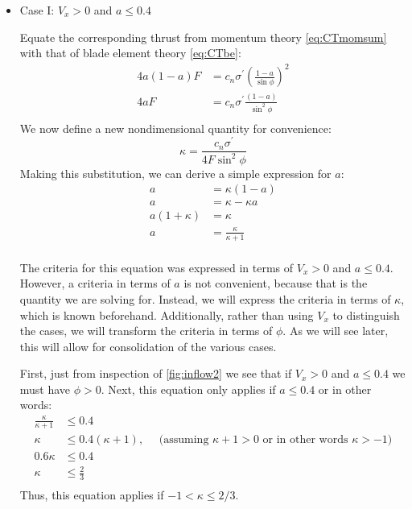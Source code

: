 \begin{itemize}

\item Case I: $V_x > 0$ and $a \le 0.4$

Equate the corresponding thrust from momentum theory \cref{eq:CTmomsum} with that of blade element theory \cref{eq:CTbe}:
\begin{equation}
    \begin{aligned}
        4 a (1 - a) F &= c_n \sigma^\prime \left(\frac{1-a}{\sin\phi}\right)^2\\
        4 a F &= c_n \sigma^\prime \frac{(1-a)}{\sin^2\phi}\\
    \end{aligned}
\end{equation}
We now define a new nondimensional quantity for convenience:
\begin{equation}
    \kappa = \frac{c_n \sigma^\prime}{4 F \sin^2 \phi}
\end{equation}
Making this substitution, we can derive a simple expression for $a$:
\begin{equation}
    \begin{aligned}
        a &= \kappa (1-a)\\
        a &= \kappa - \kappa a\\
        a (1 + \kappa) &= \kappa\\
        a &= \frac{\kappa}{\kappa + 1}\\
    \end{aligned}
\end{equation}

The criteria for this equation was expressed in terms of $V_x > 0$ and $a \le 0.4$.  However, a criteria in terms of $a$ is not convenient, because that is the quantity we are solving for.  Instead, we will express the criteria in terms of $\kappa$, which is known beforehand.  Additionally, rather than using $V_x$ to distinguish the cases, we will transform the criteria in terms of $\phi$.  As we will see later, this will allow for consolidation of the various cases.

First, just from inspection of \cref{fig:inflow2} we see that if $V_x > 0$ and $a \le 0.4$ we must have $\phi > 0$.  Next, this equation only applies if $a \le 0.4$ or in other words:
\begin{equation}
    \begin{aligned}
        \frac{\kappa}{\kappa + 1} &\le 0.4\\
        \kappa &\le 0.4 (\kappa + 1) ,\quad \text{ (assuming $\kappa + 1 > 0$ or in other words $\kappa > -1$)}\\
        0.6 \kappa &\le 0.4 \\
        \kappa &\le \frac{2}{3} \\
    \end{aligned}
\end{equation}
Thus, this equation applies if $-1 < \kappa \le 2/3$.


\end{itemize}
